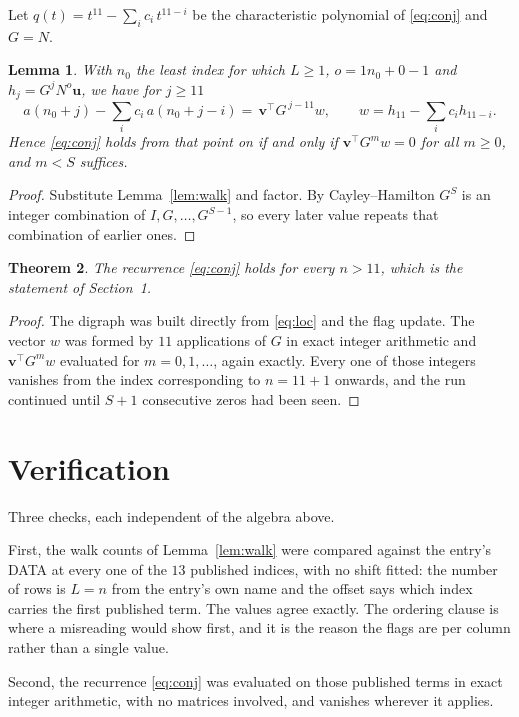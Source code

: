 \documentclass[11pt,a4paper]{article}
\theoremstyle{plain}
\newtheorem{theorem}{Theorem}
\newtheorem{lemma}[theorem]{Lemma}
\theoremstyle{definition}
\begin{document}
Let $q(t)=t^{11}-\sum_i c_i\,t^{11-i}$ be the characteristic polynomial of
\eqref{eq:conj} and $G=N$.

\begin{lemma}\label{lem:crit}
With $n_0$ the least index for which $L\ge1$, $o=1n_0+0-1$ and
$h_j=G^{j}N^{o}\mathbf{u}$, we have for $j\ge11$
\[
a(n_0+j)-\sum_i c_i\,a(n_0+j-i)=\,\mathbf{v}^{\!\top}G^{\,j-11}w,
\qquad w=h_{11}-\sum_i c_ih_{11-i} .
\]
Hence \eqref{eq:conj} holds from that point on if and only if
$\mathbf{v}^{\!\top}G^{m}w=0$ for all $m\ge0$, and $m<S$ suffices.
\end{lemma}

\begin{proof}
Substitute Lemma~\ref{lem:walk} and factor. By Cayley--Hamilton $G^{S}$ is an integer
combination of $I,G,\dots,G^{S-1}$, so every later value repeats that combination of earlier
ones.
\end{proof}

\begin{theorem}
The recurrence \eqref{eq:conj} holds for every $n>11$, which is the statement of
Section~1.
\end{theorem}

\begin{proof}
The digraph was built directly from \eqref{eq:loc} and the flag update. The vector $w$ was
formed by $11$ applications of $G$ in exact integer arithmetic and
$\mathbf{v}^{\!\top}G^{m}w$ evaluated for $m=0,1,\dots$, again exactly. Every one of
those integers vanishes from the index corresponding to $n=11+1$ onwards, and the run
continued until $S+1$ consecutive zeros had been seen.
\end{proof}

\section{Verification}

Three checks, each independent of the algebra above.

First, the walk counts of Lemma~\ref{lem:walk} were compared against the entry's DATA at
every one of the $13$ published indices, with no shift fitted: the number of rows is
$L=n$ from the entry's own name and the offset says which index carries the first
published term. The values agree exactly. The ordering clause is where a misreading would
show first, and it is the reason the flags are per column rather than a single value.

Second, the recurrence \eqref{eq:conj} was evaluated on those published terms in exact
integer arithmetic, with no matrices involved, and vanishes wherever it applies.
\end{document}
